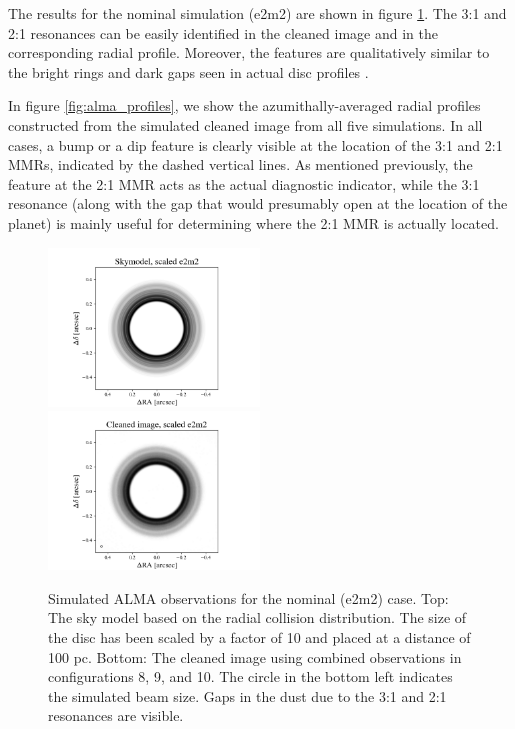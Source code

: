 \documentclass[fleqn,usenatbib]{mnras}
\begin{document}
The results for the nominal simulation (e2m2) are shown in figure \ref{fig:alma_sim_obs}. The 3:1 and 2:1 resonances can be easily identified in the 
cleaned image and in the corresponding radial profile.  Moreover, the features are qualitatively similar to the bright rings and dark gaps seen in actual 
disc profiles \citep{2015ApJ...808L...3A}.

In figure \ref{fig:alma_profiles}, we show the 
azumithally-averaged radial profiles constructed from the simulated cleaned image from all five 
simulations. In all cases, a bump or a dip feature is clearly visible at the location of the 3:1 and 2:1 MMRs, indicated by the dashed vertical lines. 
As mentioned previously, the feature at the 2:1 MMR acts as the actual diagnostic indicator, while the 3:1 resonance (along with the gap that would presumably 
open at the location of the planet) is mainly useful for 
determining where the 2:1 MMR is actually located.

\begin{figure}
\begin{center}
    \includegraphics[width=0.5\textwidth]{alma/skymodel_e2m2.png}
    \includegraphics[width=0.5\textwidth]{alma/xy_e2m2.png}
    \caption{Simulated ALMA observations for the nominal (e2m2) case.  Top: The sky model based on the radial collision distribution. The size of the disc has been scaled by a factor of 10 and placed at  a distance of 100 pc. Bottom: The cleaned image using combined observations in configurations 8, 9, and 10. The circle in the bottom left indicates the simulated beam size. Gaps in the dust due to the 3:1 and 2:1 resonances are visible. \label{fig:alma_sim_obs}}
\end{center}
\end{figure}
\end{document}
